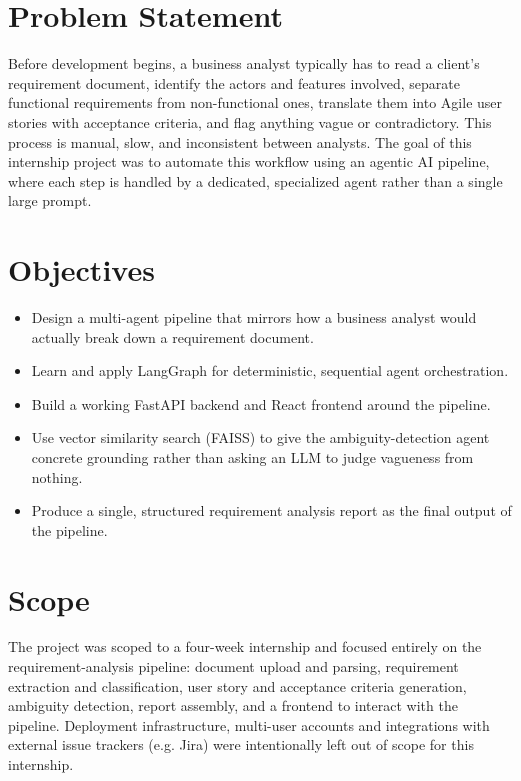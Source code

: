 \documentclass[12pt,a4paper,openany]{report}
\begin{document}
\section{Problem Statement}
Before development begins, a business analyst typically has to read a
client's requirement document, identify the actors and features involved,
separate functional requirements from non-functional ones, translate them
into Agile user stories with acceptance criteria, and flag anything vague
or contradictory. This process is manual, slow, and inconsistent between
analysts. The goal of this internship project was to automate this
workflow using an agentic AI pipeline, where each step is handled by a
dedicated, specialized agent rather than a single large prompt.

\section{Objectives}
\begin{itemize}[leftmargin=*]
\item Design a multi-agent pipeline that mirrors how a business analyst
  would actually break down a requirement document.
\item Learn and apply LangGraph for deterministic, sequential agent
  orchestration.
\item Build a working FastAPI backend and React frontend around the
  pipeline.
\item Use vector similarity search (FAISS) to give the ambiguity-detection
  agent concrete grounding rather than asking an LLM to judge vagueness
  from nothing.
\item Produce a single, structured requirement analysis report as the
  final output of the pipeline.
\end{itemize}

\section{Scope}
The project was scoped to a four-week internship and focused entirely on
the requirement-analysis pipeline: document upload and parsing, requirement
extraction and classification, user story and acceptance criteria
generation, ambiguity detection, report assembly, and a frontend to
interact with the pipeline. Deployment infrastructure, multi-user
accounts and integrations with external issue trackers (e.g. Jira) were
intentionally left out of scope for this internship.

\end{document}
